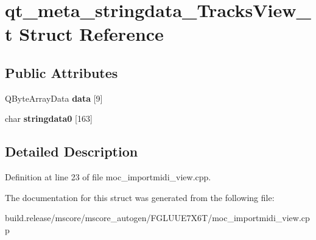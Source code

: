 \hypertarget{structqt__meta__stringdata___tracks_view__t}{}\section{qt\+\_\+meta\+\_\+stringdata\+\_\+\+Tracks\+View\+\_\+t Struct Reference}
\label{structqt__meta__stringdata___tracks_view__t}
\subsection*{Public Attributes}
\begin{DoxyCompactItemize}
\item 
\mbox{\label{structqt__meta__stringdata___tracks_view__t_a1f51dd8a2ac8b5ff0ffaa42de3211940}} 
Q\+Byte\+Array\+Data {\bfseries data} \mbox{[}9\mbox{]}
\item 
\mbox{\label{structqt__meta__stringdata___tracks_view__t_ad7438a7f6ab9e7d67d5317ff97cce3f6}} 
char {\bfseries stringdata0} \mbox{[}163\mbox{]}
\end{DoxyCompactItemize}


\subsection{Detailed Description}


Definition at line 23 of file moc\+\_\+importmidi\+\_\+view.\+cpp.



The documentation for this struct was generated from the following file\+:\begin{DoxyCompactItemize}
\item 
build.\+release/mscore/mscore\+\_\+autogen/\+F\+G\+L\+U\+U\+E7\+X6\+T/moc\+\_\+importmidi\+\_\+view.\+cpp\end{DoxyCompactItemize}
